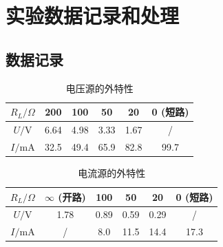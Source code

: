 ﻿\documentclass[10.5pt]{config}
\begin{document}
\section{实验数据记录和处理}
\subsection{数据记录}

\begin{table}[H]
    \centering
    \begin{tabular}{|c|c|c|c|c|c|}
        \hline
        $R_L/\Omega$ & 200 & 100 & 50 & 20 & 0 (短路) \\
        \hline
        $U/\mathrm{V}$ & 6.64 & 4.98 & 3.33 & 1.67 & / \\
        \hline
        $I/\mathrm{mA}$ & 32.5 & 49.4 & 65.9 & 82.8 & 99.7 \\
        \hline
    \end{tabular}
    \caption{电压源的外特性}
    \label{tab:voltage_source_characteristic}
\end{table}

\begin{table}[H]
    \centering
    \begin{tabular}{|c|c|c|c|c|c|}
        \hline
        $R_L/\Omega$ & $\infty$ (开路) & 100 & 50 & 20 & 0 (短路) \\
        \hline
        $U/\mathrm{V}$ & 1.78 & 0.89 & 0.59 & 0.29 & / \\
        \hline
        $I/\mathrm{mA}$ & / & 8.0 & 11.5 & 14.4 & 17.3 \\
        \hline
    \end{tabular}
    \caption{电流源的外特性}
    \label{tab:current_source_characteristic}
\end{table}


\begin{table}[H]
    \centering
    \caption{电路元件的伏安特性}
    \label{tab:diode_characteristic}
\end{table}
\end{document}
